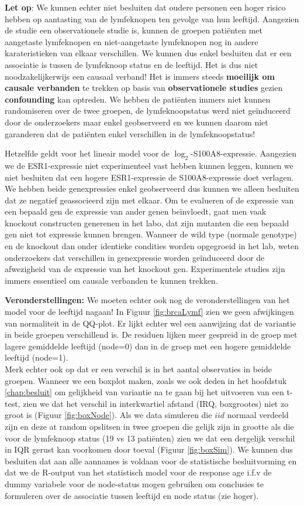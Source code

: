 \documentclass[12pt,dutch,coursenotes]{book}
\theoremstyle{definition}
\theoremstyle{definition}
\theoremstyle{definition}
\theoremstyle{remark}
\begin{document}
\textbf{Let op}: We kunnen echter niet besluiten dat oudere personen een
hoger risico hebben op aantasting van de lymfeknopen ten gevolge van hun
leeftijd. Aangezien de studie een observationele studie is, kunnen de
groepen patiënten met aangetaste lymfeknopen en niet-aangetaste
lymfeknopen nog in andere karateristieken van elkaar verschillen. We
kunnen dus enkel besluiten dat er een associatie is tussen de lymfeknoop
status en de leeftijd. Het is dus niet noodzakelijkerwijs een causaal
verband! Het is immers steeds \textbf{moeilijk om causale verbanden} te
trekken op basis van \textbf{observationele studies} gezien
\textbf{confounding} kan optreden. We hebben de patiënten immers niet
kunnen randomiseren over de twee groepen, de lymfeknoopstatus werd niet
geïnduceerd door de onderzoekers maar enkel geobserveerd en we kunnen
daarom niet garanderen dat de patiënten enkel verschillen in de
lymfeknoopstatus!

Hetzelfde geldt voor het lineair model voor de
\(\log_2\)-S100A8-expressie. Aangezien we de ESR1-expressie niet
experimenteel vast hebben kunnen leggen, kunnen we niet besluiten dat
een hogere ESR1-expressie de S100A8-expressie doet verlagen. We hebben
beide genexpressies enkel geobserveerd dus kunnen we alleen besluiten
dat ze negatief geassocieerd zijn met elkaar. Om te evalueren of de
expressie van een bepaald gen de expressie van ander genen beïnvloedt,
gaat men vaak knockout constructen generenen in het labo, dat zijn
mutanten die een bepaald gen niet tot expressie kunnen brengen. Wanneer
de wild type (normale genotype) en de knockout dan onder identieke
condities worden opgegroeid in het lab, weten onderzoekers dat
verschillen in genexpressie worden geïnduceerd door de afwezigheid van
de expressie van het knockout gen. Experimentele studies zijn immers
essentieel om causale verbanden te kunnen trekken.

\textbf{Veronderstellingen:} We moeten echter ook nog de
veronderstellingen van het model voor de leeftijd nagaan! In Figuur
\ref{fig:brcaLymf} zien we geen afwijkingen van normaliteit in de
QQ-plot. Er lijkt echter wel een aanwijzing dat de variantie in beide
groepen verschillend is. De residuen lijken meer gespreid in de groep
met lagere gemiddelde leeftijd (node=0) dan in de groep met een hogere
gemiddelde leeftijd (node=1).\\
Merk echter ook op dat er een verschil is in het aantal observaties in
beide groepen. Wanneer we een boxplot maken, zoals we ook deden in het
hoofdstuk \ref{chap:besluit} om gelijkheid van variantie na te gaan bij
het uitvoeren van een t-test, zien we dat het verschil in interkwartiel
afstand (IRQ, boxgrootes) niet zo groot is (Figuur \ref{fig:boxNode}).
Als we data simuleren die \(iid\) normaal verdeeld zijn en deze at
random opslitsen in twee groepen die gelijk zijn in grootte als die voor
de lymfeknoop status (19 vs 13 patiënten) zien we dat een dergelijk
verschil in IQR gerust kan voorkomen door toeval (Figuur
\ref{fig:boxSim}). We kunnen dus besluiten dat aan alle aannames is
voldaan voor de statistische besluitvorming en dat we de R-output van
het statistisch model voor de response age i.f.v de dummy variabele voor
de node-status mogen gebruiken om conclusies te formuleren over de
associatie tussen leeftijd en node status (zie hoger).
\end{document}
